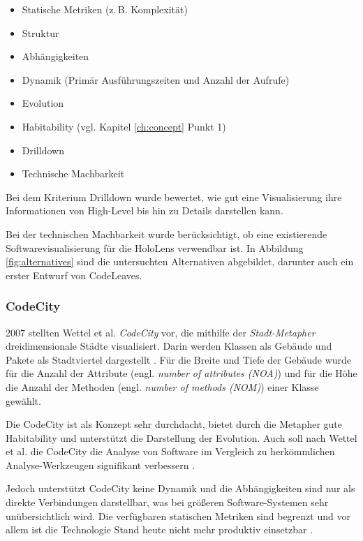 \begin{itemize}
  \item Statische Metriken (z.\,B. Komplexität)
  \item Struktur
  \item Abhängigkeiten
  \item Dynamik (Primär Ausführungszeiten und Anzahl der Aufrufe)
  \item Evolution
  \item Habitability (vgl. Kapitel \ref{ch:concept} Punkt 1)
  \item Drilldown
  \item Technische Machbarkeit
\end{itemize}

Bei dem Kriterium Drilldown wurde bewertet, wie gut eine Visualisierung ihre Informationen von High-Level bis hin zu Details darstellen kann.

Bei der technischen Machbarkeit wurde berücksichtigt, ob eine existierende Softwarevisualisierung für die HoloLens verwendbar ist. In Abbildung \ref{fig:alternatives} sind die untersuchten Alternativen abgebildet, darunter auch ein erster Entwurf von CodeLeaves.

\subsubsection*{CodeCity}
2007 stellten Wettel et al. \textit{CodeCity} vor, die mithilfe der \textit{Stadt-Metapher} dreidimensionale Städte visualisiert. Darin werden Klassen als Gebäude und Pakete als Stadtviertel dargestellt \cite{wettel2007program, wettel2008visual, wettel2011software}. Für die Breite und Tiefe der Gebäude wurde für die Anzahl der Attribute (engl. \emph{number of attributes (NOA)}) und für die Höhe die Anzahl der Methoden (engl. \emph{number of methods (NOM)}) einer Klasse gewählt.

Die CodeCity ist als Konzept sehr durchdacht, bietet durch die Metapher gute Habitability und unterstützt die Darstellung der Evolution. Auch soll nach Wettel et al. die CodeCity die Analyse von Software im Vergleich zu herkömmlichen Analyse-Werkzeugen signifikant verbessern \cite{wettel2011software}.

Jedoch unterstützt CodeCity keine Dynamik und die Abhängigkeiten sind nur als direkte Verbindungen darstellbar, was bei größeren Software-Systemen sehr unübersichtlich wird. Die verfügbaren statischen Metriken sind begrenzt und vor allem ist die Technologie Stand heute nicht mehr produktiv einsetzbar \cite{puetz2017softwarevisualisierung}.

